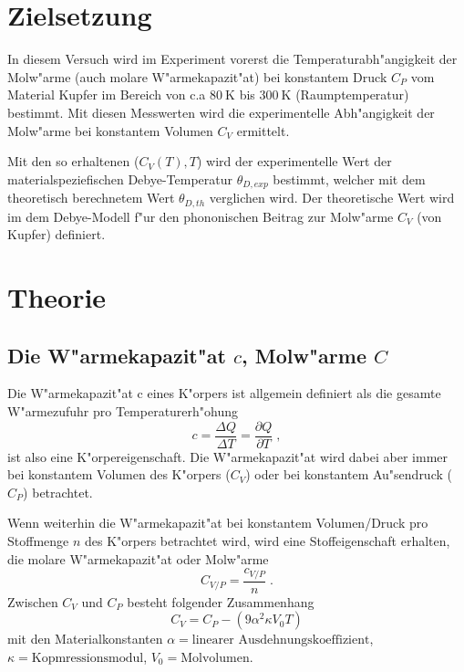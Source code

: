 \section{Zielsetzung}
  \label{sec:Zielsetzung}
  In diesem Versuch wird im Experiment vorerst die Temperaturabh"angigkeit der Molw"arme (auch molare W"armekapazit"at) bei konstantem Druck $C_P$ vom Material Kupfer im Bereich von c.a $\SI{80}{\kelvin}$ bis $\SI{300}{\kelvin}$ (Raumptemperatur) bestimmt.
  Mit diesen Messwerten wird die experimentelle Abh"angigkeit der Molw"arme bei konstantem Volumen $C_V$ ermittelt.

  Mit den so erhaltenen ($C_V(T),T$) wird der experimentelle Wert der materialspeziefischen Debye-Temperatur $\theta_{D,exp}$ bestimmt, welcher mit dem theoretisch berechnetem Wert $\theta_{D,th}$ verglichen wird.
  Der theoretische Wert wird im dem Debye-Modell f"ur den phononischen Beitrag zur Molw"arme $C_V$ (von Kupfer) definiert.




\section{Theorie}
  \label{sec:Theorie}

  \subsection{Die W"armekapazit"at $c$, Molw"arme $C$}
    Die W"armekapazit"at c eines K"orpers ist allgemein definiert als die gesamte W"armezufuhr pro Temperaturerh"ohung
    \begin{equation}
      c = \frac{\Delta Q}{\Delta T}=\frac{\partial Q}{\partial T} \; ,
    \end{equation}
    ist also eine K"orpereigenschaft.
    Die W"armekapazit"at wird dabei aber immer bei konstantem Volumen des K"orpers ($C_V$) oder bei konstantem Au"sendruck ($C_P$) betrachtet.

    Wenn weiterhin die W"armekapazit"at bei konstantem Volumen/Druck pro Stoffmenge $n$ des K"orpers betrachtet wird, wird eine Stoffeigenschaft erhalten, die molare W"armekapazit"at oder Molw"arme
    \begin{equation}
      C_{V/P} = \frac{c_{V/P}}{n} \; .
    \end{equation}
    Zwischen $C_V$ und $C_P$ besteht folgender Zusammenhang
    \begin{equation}
      C_V = C_P - (9 \alpha^2 \kappa V_0 T)
    \end{equation}
    mit den Materialkonstanten $\alpha=\text{linearer Ausdehnungskoeffizient}$, $
    \kappa=\text{Kopmressionsmodul}$, $V_0=\text{Molvolumen}$.

